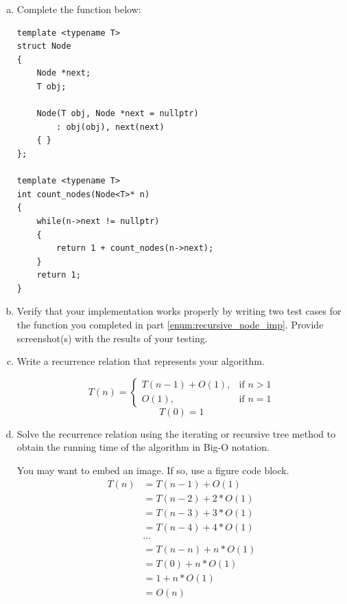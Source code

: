 \documentclass[english]{article}
\begin{document}
\begin{enumerate}[(a)]
  \item Complete the function below:
  \label{enum:recursive_node_imp}

\begin{lstlisting}
template <typename T>
struct Node
{
    Node *next;
    T obj;

    Node(T obj, Node *next = nullptr)
        : obj(obj), next(next)
    { }
};

template <typename T>
int count_nodes(Node<T>* n)
{
    while(n->next != nullptr)
    {
        return 1 + count_nodes(n->next);
    }
    return 1;
}
\end{lstlisting}

  \item Verify that your implementation works properly by writing two test cases for the function you completed in part \ref{enum:recursive_node_imp}. Provide screenshot(s) with the results of your testing.

    

  \item Write a recurrence relation that represents your algorithm.
  
  \begin{equation}
    T(n) = \begin{cases}
      T(n - 1) + O(1), & \text{if } n > 1 \\
      O(1), & \text{if } n = 1
    \end{cases} 
  \end{equation}
  \begin{equation}
    T(0) = 1
  \end{equation}

  \item Solve the recurrence relation using the iterating or recursive tree method to obtain the running time of the algorithm in Big-O notation.

  You may want to embed an image. If so, use a figure code block.
  \begin{align}
    T(n) &= T(n - 1) + O(1) \\
         &= T(n - 2) + 2 * O(1) \\
         &= T(n - 3) + 3 * O(1) \\
         &= T(n - 4) + 4 * O(1) \\
         &\cdots \\
         &= T(n - n) + n * O(1) \\ 
         &= T(0) + n * O(1) \\
         &= 1 + n * O(1) \\
         &= O(n) 
  \end{align}

\end{enumerate}
\end{document}
